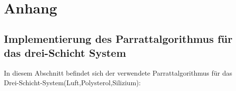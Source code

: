 \chapter*{Anhang}
\label{cha:Messdaten}


\section{Implementierung des Parrattalgorithmus für das drei-Schicht System}
In diesem Abschnitt befindet sich der verwendete Parrattalgorithmus für das Drei-Schicht-System(Luft,Polysterol,Silizium):

